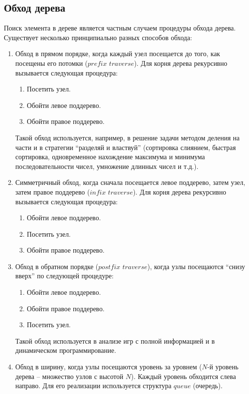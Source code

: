 \documentclass[11pt]{article}
\begin{document}
\subsection{Обход дерева}
Поиск элемента в дереве является частным случаем процедуры обхода дерева.
Существует несколько принципиально разных способов обхода:
\begin{enumerate}
\item Обход в прямом порядке, когда каждый узел посещается до того, как
  посещены его потомки ($prefix$ $traverse$). Для корня дерева рекурсивно
  вызывается следующая процедура:
  \begin{enumerate}
  \item Посетить узел.
  \item Обойти левое поддерево.
  \item Обойти правое поддерево.
  \end{enumerate}
  Такой обход используется, например, в решение задачи методом деления на части
  и в стратегии ``разделяй и властвуй'' (сортировка слиянием, быстрая 
  сортировка, одновременное нахождение максимума и минимума последовательности
  чисел, умножение длинных чисел и т.д.).
\item Симметричный обход, когда сначала посещается левое поддерево, затем
  узел, затем правое поддерево ($infix$ $traverse$). Для корня дерева рекурсивно
  вызывается следующая процедура:
  \begin{enumerate}
  \item Обойти левое поддерево.
  \item Посетить узел.
  \item Обойти правое поддерево.
  \end{enumerate}
\item Обход в обратном порядке ($postfix$ $traverse$), когда узлы посещаются
  ``снизу вверх'' по следующей процедуре:
  \begin{enumerate}
  \item Обойти левое поддерево.
  \item Обойти правое поддерево.
  \item Посетить узел.
  \end{enumerate}
  Такой обход используется в анализе игр с полной информацией и в динамическом
  программирование.
\item Обход в ширину, когда узлы посещаются уровень за уровнем ($N$-й уровень
  дерева -- множество узлов с высотой $N$). Каждый уровень обходится слева
  направо. Для его реализации используется структура $queue$ (очередь).
\end{enumerate}
\end{document}
